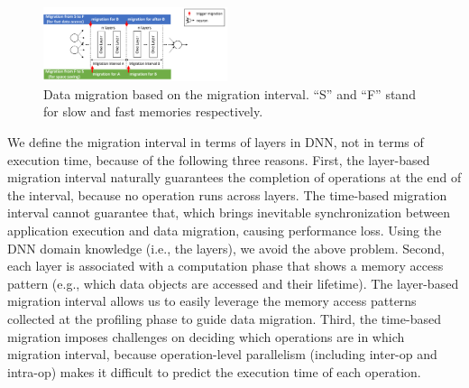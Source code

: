 \begin{figure}
\centering
\includegraphics[width=0.48\textwidth]{figures/migration_interval.pdf}
\vspace{-20pt}
\caption{
\textcolor{jie}{
Data migration based on the migration interval.  
\textcolor{check}{``S'' and ``F'' stand for slow and fast memories respectively.}}
}
	\centering
	\vspace{-5pt}
	\label{fig:migration_interval} 
\end{figure}

We define the migration interval in terms of layers in DNN, not in terms of execution time, because of the following three reasons. First, the layer-based migration interval naturally guarantees the completion of operations at the end of the interval, because no operation runs across layers. 
The time-based migration interval cannot guarantee that, which brings inevitable synchronization between application execution and data migration, causing performance loss. Using the DNN domain knowledge (i.e., the layers), we avoid the above problem. Second, each layer is associated with a computation phase that shows a memory access pattern  \textcolor{dong2}{(e.g., which data objects are  accessed and their lifetime)}. 
The layer-based migration interval allows us to easily leverage the memory access patterns collected at the profiling phase to guide data migration. Third, the time-based migration imposes challenges on deciding which operations are in which migration interval, because  \textcolor{dong}{operation-level parallelism  (including inter-op and intra-op)} 
\textcolor{dong2}{makes it difficult to predict the execution time of each operation}.


